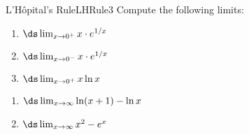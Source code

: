 \begin{example}{L'H\^opital's Rule}{LHRule3}
Compute the following limits:\\
\noindent
\begin{minipage}[t]{.5\textwidth}
\begin{enumerate}
\item		$\ds \lim_{x\to0^+} x\cdot e^{1/x}$
\item		$\ds \lim_{x\to0^-} x\cdot e^{1/x}$
\item       $\ds\lim_{x\to 0^+} x\ln x$
\end{enumerate}
\end{minipage}
\begin{minipage}[t]{.5\textwidth}
\begin{enumerate}\addtocounter{enumi}{3}
\item		$\ds \lim_{x\to\infty} \ln(x+1)-\ln x$
\item		$\ds \lim_{x\to\infty} x^2-e^x$
\end{enumerate}
\end{minipage}
\end{example}


